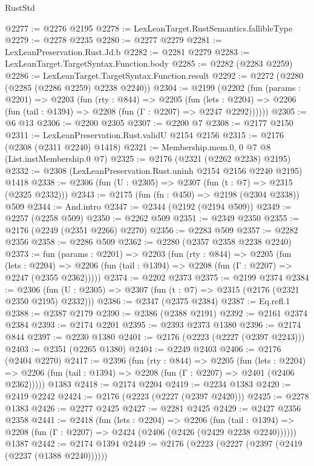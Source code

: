 \begin{lexlean}{RustStd}
\begin{coremodule}
{\begin{coremodule}
{{{{{{{{{{@2277 := @2276 @2195
@2278 := LexLeanTarget.RustSemantics.fallibleType
@2279 := @2278 @2235
@2280 := @2277 @2279
@2281 := LexLeanPreservation.Rust.Jd.b
@2282 := @2281 @2279
@2283 := LexLeanTarget.TargetSyntax.Function.body
@2285 := @2282 (@2283 @2259)
@2286 := LexLeanTarget.TargetSyntax.Function.result
@2292 := @2272 (@2280 (@2285 (@2286 @2259) @2238 @2240))
@2304 := @2199
    (@2202
      (fun (params : @2201) =>
      @2203
        (fun (rty : @844) =>
        @2205
          (fun (lets : @2204) =>
          @2206 (fun (tail : @1394) => @2208 (fun (Γ : @2207) => @2247 @2292))))))
@2305 := @6 @13
@2306 := @2200 @2305
@2307 := @2200 @7
@2308 := @2177 @2150
@2311 := LexLeanPreservation.Rust.validU @2154 @2156
@2315 := @2176 (@2308 (@2311 @2240) @1418)
@2321 := Membership.mem.{0, 0} @7 @8 (List.instMembership.{0} @7)
@2325 := @2176 (@2321 (@2262 @2238) @2195)
@2332 := @2308 (LexLeanPreservation.Rust.uninh @2154 @2156 @2240 @2195) @1418
@2338 := @2306 (fun (U : @2305) => @2307 (fun (t : @7) => @2315 (@2325 @2332)))
@2343 := @2175 (fun (fn : @450) => @2198 (@2304 @2338)) @509
@2344 := And.intro
@2347 := @2344 (@2192 (@2194 @509))
@2349 := @2257 (@2258 @509)
@2350 := @2262 @509
@2351 := @2349 @2350
@2355 := @2176 (@2249 (@2351 @2266) @2270)
@2356 := @2283 @509
@2357 := @2282 @2356
@2358 := @2286 @509
@2362 := @2280 (@2357 @2358 @2238 @2240)
@2373 := fun (params : @2201) =>
  @2203
    (fun (rty : @844) =>
    @2205
      (fun (lets : @2204) =>
      @2206 (fun (tail : @1394) => @2208 (fun (Γ : @2207) => @2247 (@2355 @2362)))))
@2374 := @2202 @2373
@2375 := @2199 @2374
@2384 := @2306 (fun (U : @2305) => @2307 (fun (t : @7) => @2315 (@2176 (@2321 @2350 @2195) @2332)))
@2386 := @2347 (@2375 @2384)
@2387 := Eq.refl.{1}
@2388 := @2387 @2179
@2390 := @2386 (@2388 @2191)
@2392 := @2161 @2374 @2384
@2393 := @2174 @2201
@2395 := @2393 @2373 @1380
@2396 := @2174 @844
@2397 := @2230 @1380
@2401 := @2176 (@2223 (@2227 (@2397 @2243)))
@2403 := @2351 (@2265 @1380)
@2404 := @2249 @2403
@2406 := @2176 (@2404 @2270)
@2417 := @2396
    (fun (rty : @844) =>
    @2205
      (fun (lets : @2204) =>
      @2206 (fun (tail : @1394) => @2208 (fun (Γ : @2207) => @2401 (@2406 @2362)))))
    @1383
@2418 := @2174 @2204
@2419 := @2234 @1383
@2420 := @2419 @2242
@2424 := @2176 (@2223 (@2227 (@2397 @2420)))
@2425 := @2278 @1383
@2426 := @2277 @2425
@2427 := @2281 @2425
@2429 := @2427 @2356 @2358
@2441 := @2418
    (fun (lets : @2204) =>
    @2206
      (fun (tail : @1394) => @2208 (fun (Γ : @2207) => @2424 (@2406 (@2426 (@2429 @2238 @2240))))))
    @1387
@2442 := @2174 @1394
@2449 := @2176 (@2223 (@2227 (@2397 (@2419 (@2237 (@1388 @2240))))))
}}}}}}}}}}
\end{coremodule}}
\end{coremodule}
\end{lexlean}
